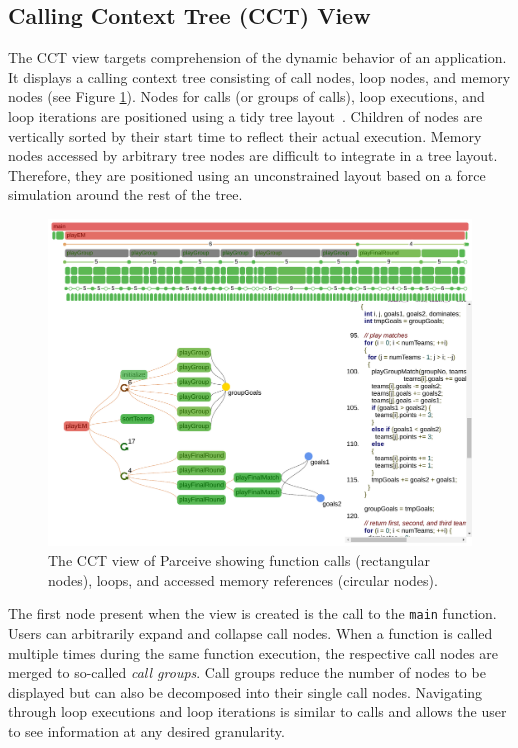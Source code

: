 \subsection{Calling Context Tree (CCT) View}
The CCT view targets comprehension of the dynamic behavior of an application.
It displays a calling context tree consisting of call nodes, loop nodes, and
memory nodes (see Figure \ref{fig:cct_view}). Nodes for calls (or groups of
calls), loop executions, and loop iterations are positioned using a tidy tree
layout~\cite{TidierTree}. Children of nodes are vertically sorted by their
start time to reflect their actual execution. Memory nodes accessed by
arbitrary tree nodes are difficult to integrate in a tree layout. Therefore,
they are positioned using an unconstrained layout based on a force simulation
around the rest of the tree.

\begin{figure}[h!]
\includegraphics[clip, trim=0.9cm 2.5cm 8.5cm 8.5cm,
width=\linewidth]{img/cct_view}
\caption{The CCT view of Parceive showing function calls (rectangular nodes),
loops, and accessed memory references (circular nodes).}
\label{fig:cct_view}	
\end{figure}

The first node present when the view is created is the call to the
\texttt{main} function. Users can arbitrarily expand and collapse call nodes.
When a function is called multiple times during the same function execution,
the respective call nodes are merged to so-called \textit{call groups}. Call
groups reduce the number of nodes to be displayed but can also be decomposed
into their single call nodes. Navigating through loop executions and loop
iterations is similar to calls and allows the user to see information at any
desired granularity. 

